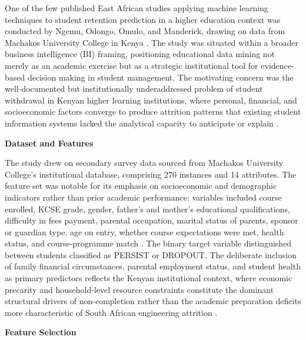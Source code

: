 \documentclass[12pt]{report}
\begin{document}
One of the few published East African studies applying machine learning techniques to student retention prediction
 in a higher education context was conducted by Ngemu, Odongo, Omulo, and Manderick, drawing on data from Machakos 
 University College in Kenya \parencite{Ngemu2015}. The study was situated within a broader business intelligence (BI) 
 framing, positioning educational data mining not merely as an academic exercise but as a strategic institutional tool
  for evidence-based decision making in student management. The motivating concern was the well-documented but
   institutionally underaddressed problem of student withdrawal in Kenyan higher learning institutions, where 
   personal, financial, and socioeconomic factors converge to produce attrition patterns that existing student 
   information systems lacked the analytical capacity to anticipate or explain \parencite{Ngemu2015}.

\textbf{Dataset and Features}

The study drew on secondary survey data sourced from Machakos University College's institutional database, 
comprising 270 instances and 14 attributes. The feature set was notable for its emphasis on socioeconomic
 and demographic indicators rather than prior academic performance: variables included course enrolled, KCSE 
 grade, gender, father's and mother's educational qualifications, difficulty in fees payment, parental occupation,
  marital status of parents, sponsor or guardian type, age on entry, whether course expectations were met, health 
  status, and course-programme match \parencite{Ngemu2015}. The binary target variable distinguished between students
   classified as PERSIST or DROPOUT. The deliberate inclusion of family financial circumstances, parental employment
    status, and student health as primary predictors reflects the Kenyan institutional context, where economic precarity
     and household-level resource constraints constitute the dominant structural drivers of non-completion rather than 
     the academic preparation deficits more characteristic of South African engineering attrition \parencite{Ngemu2015}.

\textbf{Feature Selection}
\end{document}
